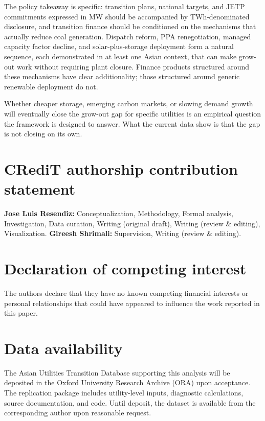 \documentclass[review,3p,authoryear]{elsarticle}
\begin{document}
The policy takeaway is specific: transition plans, national targets, and JETP commitments expressed in MW should be accompanied by TWh-denominated disclosure, and transition finance should be conditioned on the mechanisms that actually reduce coal generation. Dispatch reform, PPA renegotiation, managed capacity factor decline, and solar-plus-storage deployment form a natural sequence, each demonstrated in at least one Asian context, that can make grow-out work without requiring plant closure. Finance products structured around these mechanisms have clear additionality; those structured around generic renewable deployment do not.

Whether cheaper storage, emerging carbon markets, or slowing demand growth will eventually close the grow-out gap for specific utilities is an empirical question the framework is designed to answer. What the current data show is that the gap is not closing on its own.

\section*{CRediT authorship contribution statement}

\textbf{Jose Luis Resendiz:} Conceptualization, Methodology, Formal analysis, Investigation, Data curation, Writing (original draft), Writing (review \& editing), Visualization. \textbf{Gireesh Shrimali:} Supervision, Writing (review \& editing).

\section*{Declaration of competing interest}

The authors declare that they have no known competing financial interests or personal relationships that could have appeared to influence the work reported in this paper.

\section*{Data availability}

The Asian Utilities Transition Database supporting this analysis will be deposited in the Oxford University Research Archive (ORA) upon acceptance. The replication package includes utility-level inputs, diagnostic calculations, source documentation, and code. Until deposit, the dataset is available from the corresponding author upon reasonable request.
\end{document}
